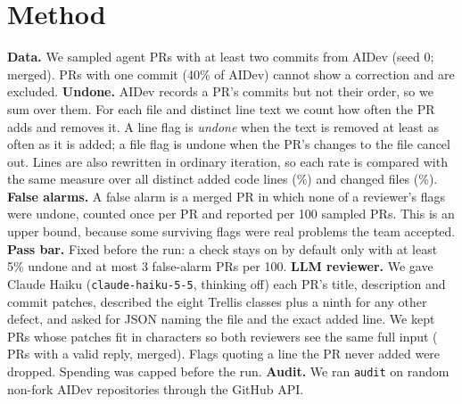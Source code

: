 \documentclass[sigconf]{acmart}
\begin{document}
\section{Method}\label{sec:method}
\textbf{Data.} We sampled \nPRs{} agent PRs with at least two commits from AIDev (seed 0; \nMerged{} merged). PRs with one commit (40\% of AIDev) cannot show a correction and are excluded.
\textbf{Undone.} AIDev records a PR's commits but not their order, so we sum over them. For each file and distinct line text we count how often the PR adds and removes it. A line flag is \emph{undone} when the text is removed at least as often as it is added; a file flag is undone when the PR's changes to the file cancel out. Lines are also rewritten in ordinary iteration, so each rate is compared with the same measure over all \nLines{} distinct added code lines (\baseLine\%) and \nFiles{} changed files (\baseFile\%).
\textbf{False alarms.} A false alarm is a merged PR in which none of a reviewer's flags were undone, counted once per PR and reported per 100 sampled PRs. This is an upper bound, because some surviving flags were real problems the team accepted.
\textbf{Pass bar.} Fixed before the run: a check stays on by default only with at least 5\% undone and at most 3 false-alarm PRs per 100.
\textbf{LLM reviewer.} We gave Claude Haiku (\texttt{claude-haiku-5-5}, thinking off) each PR's title, description and commit patches, described the eight Trellis classes plus a ninth for any other defect, and asked for JSON naming the file and the exact added line. We kept PRs whose patches fit in \lMaxChars{} characters so both reviewers see the same full input (\lPRs{} PRs with a valid reply, \lMerged{} merged). Flags quoting a line the PR never added were dropped. Spending was capped before the run.
\textbf{Audit.} We ran \texttt{audit} on \aSampled{} random non-fork AIDev repositories through the GitHub API.
\end{document}
